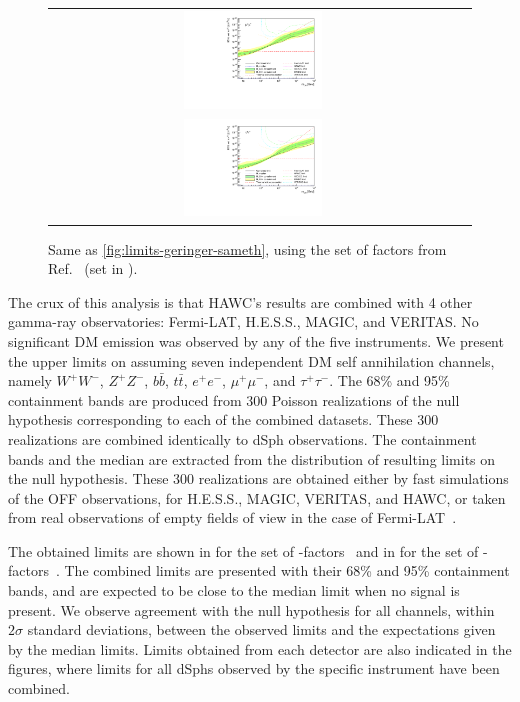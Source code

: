 \begin{figure}[t]
{\begin{tabular}{cc}
        \includegraphics[width=0.35\textwidth]{figures/glory_duck/limits/Glory_Duck_Annihilation_mumu_Bonnivard_Combination_bands.pdf} \\
        \includegraphics[width=0.35\textwidth]{figures/glory_duck/limits/Glory_Duck_Annihilation_tautau_Bonnivard_Combination_bands.pdf} &
        \end{tabular}
        }
        \caption{Same as \cref{fig:limits-geringer-sameth}, using the set of \J factors from Ref.~\cite{Bonnivard:2014kza, Bonnivard:2015xpq} (\B set in ).}
    \label{fig:limits-bonnivard}
    \end{figure}

The crux of this analysis is that HAWC's results are combined with 4 other gamma-ray observatories: Fermi-LAT, H.E.S.S., MAGIC, and VERITAS.
\sloppy No significant DM emission was observed by any of the five instruments.
We present the upper limits on \sv assuming seven independent DM self annihilation channels, namely $W^+W^-$, $Z^+Z^-$, $b\bar{b}$, $t\bar{t}$, $e^+e^-$, $\mu^+\mu^-$, and $\tau^+\tau^-$.
The 68\% and 95\% containment bands are produced from 300 Poisson realizations of the null hypothesis corresponding to each of the combined datasets.
These 300 realizations are combined identically to dSph observations.
The containment bands and the median are extracted from the distribution of resulting limits on the null hypothesis.
These 300 realizations are obtained either by fast simulations of the OFF observations, for H.E.S.S., MAGIC, VERITAS, and HAWC, or taken from real observations of empty fields of view in the case of Fermi-LAT~\cite{2015PhRvL.115w1301A,Fermi-LAT:2016uux,2021PhRvD.103l3005D}.

The obtained limits are shown in  for the \GS set of \J-factors~\cite{Geringer-Sameth:2014yza} and in  for the \B set of \J-factors~\cite{Bonnivard:2014kza, Bonnivard:2015xpq}.
The combined limits are presented with their 68\% and 95\% containment bands, and are expected to be close to the median limit when no signal is present.
We observe agreement with the null hypothesis for all channels, within $2\sigma$ standard deviations, between the observed limits and the expectations given by the median limits.
Limits obtained from each detector are also indicated in the figures, where limits for all dSphs observed by the specific instrument have been combined.

